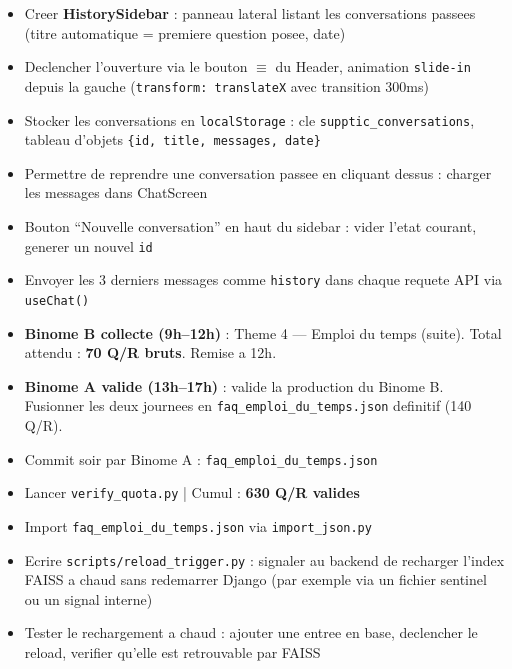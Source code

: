 \documentclass[11pt,a4paper]{article}
\begin{document}
\begin{reactbox}[Frontend --- J8]
\begin{itemize}
    \item[$\square$] Creer \textbf{HistorySidebar} : panneau lateral listant les conversations passees (titre automatique = premiere question posee, date)
    \item[$\square$] Declencher l'ouverture via le bouton $\equiv$ du Header, animation \texttt{slide-in} depuis la gauche (\texttt{transform: translateX} avec transition 300ms)
    \item[$\square$] Stocker les conversations en \texttt{localStorage} : cle \texttt{supptic\_conversations}, tableau d'objets \texttt{\{id, title, messages, date\}}
    \item[$\square$] Permettre de reprendre une conversation passee en cliquant dessus : charger les messages dans ChatScreen
    \item[$\square$] Bouton ``Nouvelle conversation'' en haut du sidebar : vider l'etat courant, generer un nouvel \texttt{id}
    \item[$\square$] Envoyer les 3 derniers messages comme \texttt{history} dans chaque requete API via \texttt{useChat()}
\end{itemize}
\end{reactbox}

\begin{databox}[Data --- J8]
\begin{itemize}
    \item[$\square$] \textbf{Binome B collecte (9h--12h)} : Theme 4 --- Emploi du temps (suite). Total attendu : \textbf{70 Q/R bruts}. Remise a 12h.
    \item[$\square$] \textbf{Binome A valide (13h--17h)} : valide la production du Binome B. Fusionner les deux journees en \texttt{faq\_emploi\_du\_temps.json} definitif (140 Q/R).
    \item[$\square$] Commit soir par Binome A : \texttt{faq\_emploi\_du\_temps.json}
    \item[$\square$] Lancer \texttt{verify\_quota.py} | Cumul : \textbf{630 Q/R valides}
\end{itemize}
\end{databox}

\begin{dbbox}
\begin{itemize}
    \item[$\square$] Import \texttt{faq\_emploi\_du\_temps.json} via \texttt{import\_json.py}
    \item[$\square$] Ecrire \texttt{scripts/reload\_trigger.py} : signaler au backend de recharger l'index FAISS a chaud sans redemarrer Django (par exemple via un fichier sentinel ou un signal interne)
    \item[$\square$] Tester le rechargement a chaud : ajouter une entree en base, declencher le reload, verifier qu'elle est retrouvable par FAISS
\end{itemize}
\end{dbbox}
\end{document}
